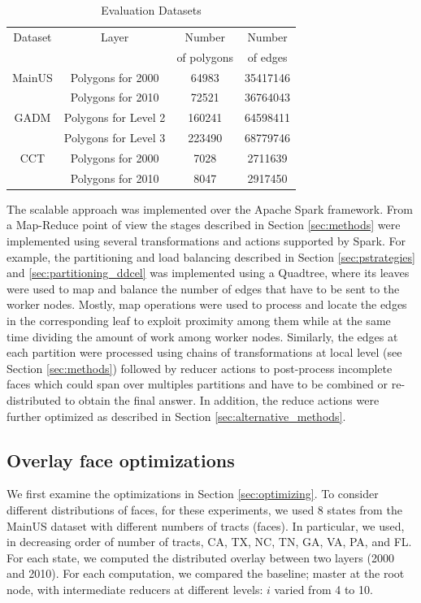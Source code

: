 \begin{table}
    \centering
    \caption{Evaluation Datasets}
    \label{tab:datasets}
    \begin{tabular}{c c c c}
        \toprule
        Dataset & Layer & Number        & Number    \\
                &       & of polygons   & of edges  \\
        \midrule
        MainUS& Polygons for 2000 & 64983 & 35417146        \\
              & Polygons for 2010 & 72521 & 36764043        \\
        GADM  & Polygons for Level 2 & 160241 & 64598411    \\
              & Polygons for Level 3 & 223490 & 68779746    \\
        CCT   & Polygons for 2000 & 7028 & 2711639          \\
              & Polygons for 2010 & 8047 & 2917450          \\
        \bottomrule
    \end{tabular}
\end{table}

The scalable approach was implemented over the Apache Spark framework.  From a Map-Reduce point of view the stages described in Section  \ref{sec:methods} were implemented using several transformations and actions supported by Spark.  For example, the partitioning and load balancing described in Section \ref{sec:pstrategies} and \ref{sec:partitioning_ddcel} was implemented using a Quadtree, where its leaves were used to map and balance the number of edges that have to be sent to the worker nodes.  Mostly, map operations were used to process and locate the edges in the corresponding leaf to exploit proximity among them while at the same time dividing the amount of work among worker nodes.
Similarly, the edges at each partition were processed using chains of transformations at local level (see Section \ref{sec:methods}) followed by reducer actions to post-process incomplete faces which could span over multiples partitions and have to be combined or re-distributed to obtain the final answer.  In addition, the reduce actions were further optimized as described in Section \ref{sec:alternative_methods}.

\subsection{Overlay face optimizations}\label{sec:overlay_optimization}
We first examine the optimizations in Section \ref{sec:optimizing}. To consider different distributions of faces, for these experiments, we used 8 states from the MainUS dataset with different numbers of tracts (faces). In particular, we used, in decreasing order of number of tracts, CA, TX, NC, TN, GA, VA, PA, and FL. For each state, we computed the distributed overlay between two layers (2000 and 2010). For each computation, we compared the baseline; master at the root node, with intermediate reducers at different levels: $i$ varied from 4 to 10. 

